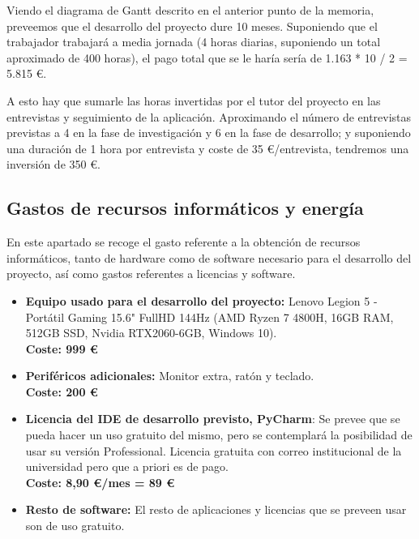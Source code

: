 Viendo el diagrama de Gantt descrito en el anterior punto de la memoria, preveemos que el desarrollo del proyecto dure 10 meses. Suponiendo que el trabajador trabajará a media jornada (4 horas diarias, suponiendo un total aproximado de 400 horas), el pago total que se le haría sería de 1.163 * 10 / 2 = 5.815 \euro.\newline

A esto hay que sumarle las horas invertidas por el tutor del proyecto en las entrevistas y seguimiento de la aplicación. Aproximando el número de entrevistas previstas a 4 en la fase de investigación y 6 en la fase de desarrollo; y suponiendo una duración de 1 hora por entrevista y coste de 35 \euro/entrevista, tendremos una inversión de 350 \euro.\newline

\subsection{Gastos de recursos informáticos y energía}

En este apartado se recoge el gasto referente a la obtención de recursos informáticos, tanto de hardware como de software necesario para el desarrollo del proyecto, así como gastos referentes a licencias y software.\newline

\begin{itemize}
	\item \textbf{Equipo usado para el desarrollo del proyecto:} Lenovo Legion 5 - Portátil Gaming 15.6" FullHD 144Hz (AMD Ryzen 7 4800H, 16GB RAM, 512GB SSD, Nvidia RTX2060-6GB, Windows 10). \\ \textbf{Coste: 999 \euro}\newline
	\item \textbf{Periféricos adicionales:} Monitor extra, ratón y teclado.\\ \textbf{Coste: 200 \euro}\newline
	\item \textbf{Licencia del IDE de desarrollo previsto, PyCharm}: Se prevee que se pueda hacer un uso gratuito del mismo, pero se contemplará la posibilidad de usar su versión Professional. Licencia gratuita con correo institucional de la universidad pero que a priori es de pago.\\ \textbf{Coste: 8,90 \euro/mes = 89 \euro}\newline
	\item \textbf{Resto de software:} El resto de aplicaciones y licencias que se preveen usar son de uso gratuito.\newline
\end{itemize}

